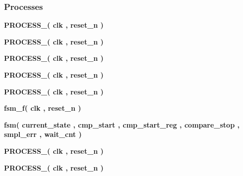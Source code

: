 \subsubsection*{Processes}
 \begin{DoxyCompactItemize}
\item 
{\bf P\+R\+O\+C\+E\+S\+S\+\_}{\bfseries  ( {\bfseries {\bfseries {\bf clk}} \textcolor{vhdlchar}{ }} , {\bfseries {\bfseries {\bf reset\+\_\+n}} \textcolor{vhdlchar}{ }} )}
\item 
{\bf P\+R\+O\+C\+E\+S\+S\+\_}{\bfseries  ( {\bfseries {\bfseries {\bf clk}} \textcolor{vhdlchar}{ }} , {\bfseries {\bfseries {\bf reset\+\_\+n}} \textcolor{vhdlchar}{ }} )}
\item 
{\bf P\+R\+O\+C\+E\+S\+S\+\_}{\bfseries  ( {\bfseries {\bfseries {\bf clk}} \textcolor{vhdlchar}{ }} , {\bfseries {\bfseries {\bf reset\+\_\+n}} \textcolor{vhdlchar}{ }} )}
\item 
{\bf P\+R\+O\+C\+E\+S\+S\+\_}{\bfseries  ( {\bfseries {\bfseries {\bf clk}} \textcolor{vhdlchar}{ }} , {\bfseries {\bfseries {\bf reset\+\_\+n}} \textcolor{vhdlchar}{ }} )}
\item 
{\bf P\+R\+O\+C\+E\+S\+S\+\_}{\bfseries  ( {\bfseries {\bfseries {\bf clk}} \textcolor{vhdlchar}{ }} , {\bfseries {\bfseries {\bf reset\+\_\+n}} \textcolor{vhdlchar}{ }} )}
\item 
{\bf fsm\+\_\+f}{\bfseries  ( {\bfseries {\bfseries {\bf clk}} \textcolor{vhdlchar}{ }} , {\bfseries {\bfseries {\bf reset\+\_\+n}} \textcolor{vhdlchar}{ }} )}
\item 
{\bf fsm}{\bfseries  ( {\bfseries {\bfseries {\bf current\+\_\+state}} \textcolor{vhdlchar}{ }} , {\bfseries {\bfseries {\bf cmp\+\_\+start}} \textcolor{vhdlchar}{ }} , {\bfseries {\bfseries {\bf cmp\+\_\+start\+\_\+reg}} \textcolor{vhdlchar}{ }} , {\bfseries {\bfseries {\bf compare\+\_\+stop}} \textcolor{vhdlchar}{ }} , {\bfseries {\bfseries {\bf smpl\+\_\+err}} \textcolor{vhdlchar}{ }} , {\bfseries {\bfseries {\bf wait\+\_\+cnt}} \textcolor{vhdlchar}{ }} )}
\item 
{\bf P\+R\+O\+C\+E\+S\+S\+\_}{\bfseries  ( {\bfseries {\bfseries {\bf clk}} \textcolor{vhdlchar}{ }} , {\bfseries {\bfseries {\bf reset\+\_\+n}} \textcolor{vhdlchar}{ }} )}
\item 
{\bf P\+R\+O\+C\+E\+S\+S\+\_}{\bfseries  ( {\bfseries {\bfseries {\bf clk}} \textcolor{vhdlchar}{ }} , {\bfseries {\bfseries {\bf reset\+\_\+n}} \textcolor{vhdlchar}{ }} )}
\end{DoxyCompactItemize}

